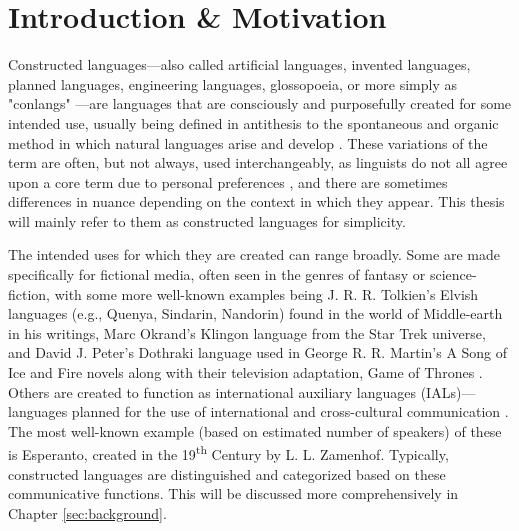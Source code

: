 \documentclass[12pt,a4paper]{article}
\numberwithin{figure}{section}
\numberwithin{table}{section}
\numberwithin{definition}{section}
\begin{document}

\pagestyle{fancy}
\fancyhf{}
\fancyhead[L]{\textcolor{gray}{\slshape\nouppercase{\rightmark}}}
\fancyhead[R]{\thepage}
\fancyfoot[R]{\textcolor{gray}{Seminar für Sprachwissenschaft Universität Tübingen}}
\renewcommand{\headrulewidth}{0.4pt}

\renewcommand{\headrulewidth}{0.5pt}
\renewcommand{\footrulewidth}{0.5pt}



\setcounter{page}{1}

\section{Introduction \& Motivation} 
\label{sec:intro}


Constructed languages---also called artificial languages, invented languages, planned languages, engineering languages, glossopoeia, or more simply as "conlangs" \parencite{douglas2015book}---are languages that are consciously and purposefully created for some intended use, usually being defined in antithesis to the spontaneous and organic method in which natural languages arise and develop \parencite{sanders2016article}. These variations of the term are often, but not always, used interchangeably, as linguists do not all agree upon a core term due to personal preferences \parencite{Adelman2014article}, and there are sometimes differences in nuance depending on the context in which they appear. This thesis will mainly refer to them as constructed languages for simplicity.

The intended uses for which they are created can range broadly. Some are made specifically for fictional media, often seen in the genres of fantasy or science-fiction, with some more well-known examples being J. R. R. Tolkien's Elvish languages (e.g., Quenya, Sindarin, Nandorin) found in the world of Middle-earth in his writings, Marc Okrand's Klingon language from the Star Trek universe, and David J. Peter's Dothraki language used in George R. R. Martin's A Song of Ice and Fire novels along with their television adaptation, Game of Thrones \parencite{punske2020book}. Others are created to function as international auxiliary languages (IALs)---languages planned for the use of international and cross-cultural communication \parencite{Gobbo2016article}. The most well-known example (based on estimated number of speakers) of these is Esperanto, created in the 19\textsuperscript{th} Century by L. L. Zamenhof. Typically, constructed languages are distinguished and categorized based on these communicative functions. This will be discussed more comprehensively in Chapter \ref{sec:background}. 
\end{document}
